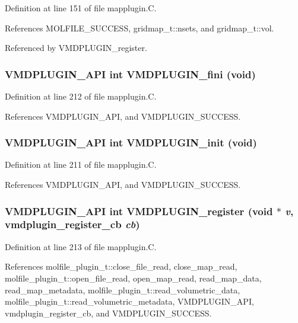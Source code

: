 Definition at line 151 of file mapplugin.C.

References MOLFILE\_\-SUCCESS, gridmap\_\-t::nsets, and gridmap\_\-t::vol.

Referenced by VMDPLUGIN\_\-register.
\subsubsection{\setlength{\rightskip}{0pt plus 5cm}VMDPLUGIN\_\-API int VMDPLUGIN\_\-fini (void)}\label{mapplugin_8C_a8}




Definition at line 212 of file mapplugin.C.

References VMDPLUGIN\_\-API, and VMDPLUGIN\_\-SUCCESS.
\subsubsection{\setlength{\rightskip}{0pt plus 5cm}VMDPLUGIN\_\-API int VMDPLUGIN\_\-init (void)}\label{mapplugin_8C_a7}




Definition at line 211 of file mapplugin.C.

References VMDPLUGIN\_\-API, and VMDPLUGIN\_\-SUCCESS.
\subsubsection{\setlength{\rightskip}{0pt plus 5cm}VMDPLUGIN\_\-API int VMDPLUGIN\_\-register (void $\ast$ {\em v}, {\bf vmdplugin\_\-register\_\-cb} {\em cb})}\label{mapplugin_8C_a9}




Definition at line 213 of file mapplugin.C.

References molfile\_\-plugin\_\-t::close\_\-file\_\-read, close\_\-map\_\-read, molfile\_\-plugin\_\-t::open\_\-file\_\-read, open\_\-map\_\-read, read\_\-map\_\-data, read\_\-map\_\-metadata, molfile\_\-plugin\_\-t::read\_\-volumetric\_\-data, molfile\_\-plugin\_\-t::read\_\-volumetric\_\-metadata, VMDPLUGIN\_\-API, vmdplugin\_\-register\_\-cb, and VMDPLUGIN\_\-SUCCESS.


